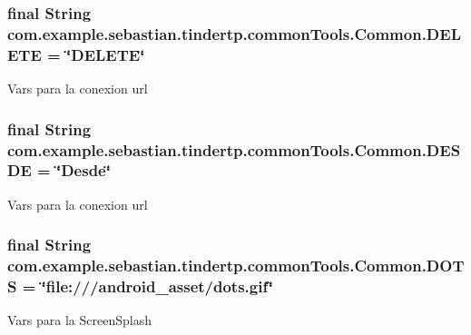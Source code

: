 \subsubsection[{\texorpdfstring{D\+E\+L\+E\+TE}{DELETE}}]{\setlength{\rightskip}{0pt plus 5cm}final String com.\+example.\+sebastian.\+tindertp.\+common\+Tools.\+Common.\+D\+E\+L\+E\+TE = \char`\"{}D\+E\+L\+E\+TE\char`\"{}\hspace{0.3cm}{\ttfamily [static]}}\hypertarget{classcom_1_1example_1_1sebastian_1_1tindertp_1_1commonTools_1_1Common_a67f9c93c36818b5e774ffbac7e9004ec}{}\label{classcom_1_1example_1_1sebastian_1_1tindertp_1_1commonTools_1_1Common_a67f9c93c36818b5e774ffbac7e9004ec}
Vars para la conexion url 
\subsubsection[{\texorpdfstring{D\+E\+S\+DE}{DESDE}}]{\setlength{\rightskip}{0pt plus 5cm}final String com.\+example.\+sebastian.\+tindertp.\+common\+Tools.\+Common.\+D\+E\+S\+DE = \char`\"{}Desde\char`\"{}\hspace{0.3cm}{\ttfamily [static]}}\hypertarget{classcom_1_1example_1_1sebastian_1_1tindertp_1_1commonTools_1_1Common_adaea9c1bfcff07777a2434f19ea035f5}{}\label{classcom_1_1example_1_1sebastian_1_1tindertp_1_1commonTools_1_1Common_adaea9c1bfcff07777a2434f19ea035f5}
Vars para la conexion url 
\subsubsection[{\texorpdfstring{D\+O\+TS}{DOTS}}]{\setlength{\rightskip}{0pt plus 5cm}final String com.\+example.\+sebastian.\+tindertp.\+common\+Tools.\+Common.\+D\+O\+TS = \char`\"{}file\+:///android\+\_\+asset/dots.\+gif\char`\"{}\hspace{0.3cm}{\ttfamily [static]}}\hypertarget{classcom_1_1example_1_1sebastian_1_1tindertp_1_1commonTools_1_1Common_af9ff2dd415fc9361e082cf3877c8c635}{}\label{classcom_1_1example_1_1sebastian_1_1tindertp_1_1commonTools_1_1Common_af9ff2dd415fc9361e082cf3877c8c635}
Vars para la Screen\+Splash 
